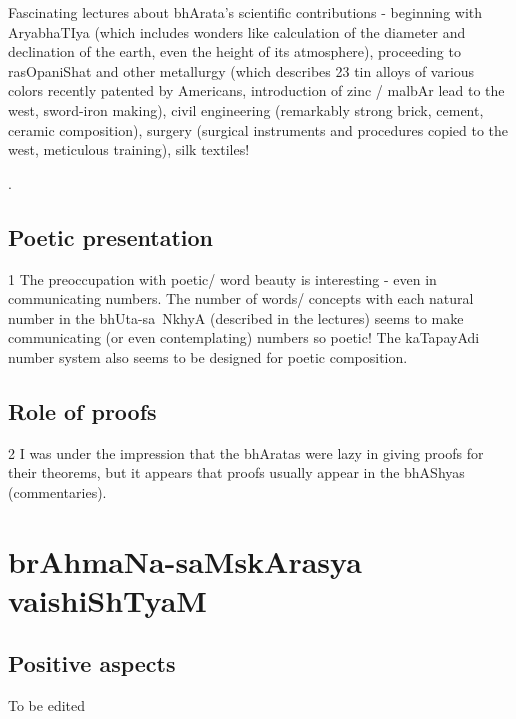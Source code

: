 \documentclass[oneside, article]{memoir}
\begin{document}
Fascinating lectures about bhArata's scientific contributions - beginning with AryabhaTIya (which includes wonders like calculation of the diameter and declination of the earth, even the height of its atmosphere), proceeding to rasOpaniShat and other metallurgy (which describes 23 tin alloys of various colors recently patented by Americans, introduction of zinc / malbAr lead to the west, sword-iron making), civil engineering (remarkably strong brick, cement, ceramic composition), surgery (surgical instruments and procedures copied to the west, meticulous training), silk textiles! 

.

\subsection{Poetic presentation}
1 The preoccupation with poetic/ word beauty is interesting - even in communicating numbers. The number of words/ concepts with each natural number in the bhUta-sa~NkhyA (described in the lectures) seems to make communicating (or even contemplating) numbers so poetic! The kaTapayAdi number system also seems to be designed for poetic composition.

\subsection{Role of proofs}
2 I was under the impression that the bhAratas were lazy in giving proofs for their theorems, but it appears that proofs usually appear in the bhAShyas (commentaries).

\section{brAhmaNa-saMskArasya vaishiShTyaM}
\subsection{Positive aspects}
\tbc To be edited
\end{document}
